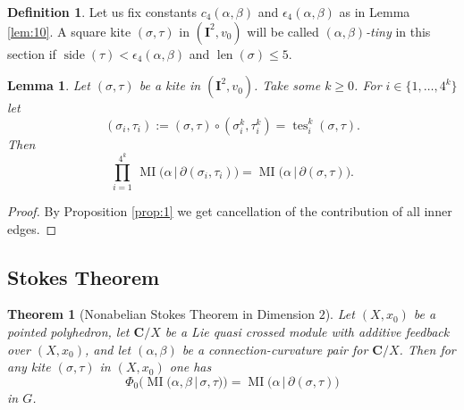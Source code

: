 \documentclass[10pt, a4paper]{amsart}
\newtheorem{thm}[equation]{Theorem}
\newtheorem{lem}[equation]{Lemma}
\theoremstyle{definition}
\newtheorem{dfn}[equation]{Definition}
\numberwithin{equation}{section}
\newcommand{\opn}{\operatorname}
\newcommand{\mbf}[1]{\mathbf{#1}}
\renewcommand{\vert}{\, | \,}
\begin{document}
\begin{dfn} \label{dfn:34}
Let us fix constants $c_4(\alpha, \beta)$ and $\epsilon_4(\alpha, \beta)$ as in
Lemma \ref{lem:10}. 
A square kite $(\sigma, \tau)$ in $(\mbf{I}^2, v_0)$ will be
called {\em $(\alpha, \beta)$-tiny} in this section if 
$\opn{side}(\tau) < \epsilon_4(\alpha, \beta)$ and
$\opn{len}(\sigma) \leq 5$.
\end{dfn}

\begin{lem} \label{lem:7}
Let $(\sigma, \tau)$ be a kite in $(\mbf{I}^2, v_0)$. 
Take some $k \geq 0$. For $i \in \{ 1, \ldots, 4^k \}$ let 
\[ (\sigma_i, \tau_i) := (\sigma, \tau) \circ (\sigma^k_i, \tau^k_i)
= \opn{tes}^k_i (\sigma, \tau) . \]
Then
\[ \prod_{i = 1}^{4^k} \, 
\opn{MI} \bigl( \alpha \vert \partial(\sigma_i, \tau_i) \bigr) =
\opn{MI} \bigl( \alpha \vert \partial  (\sigma, \tau) \bigr) . \]
\end{lem}

\begin{proof}
By Proposition \ref{prop:1} we get cancellation of the contribution of all
inner edges. 
\end{proof}


\subsection{Stokes Theorem}

\begin{thm}[Nonabelian Stokes Theorem in Dimension $2$] \label{thm:1}
Let $(X, x_0)$ be a pointed polyhedron, let 	
$\mbf{C} / X$ be a Lie quasi crossed module with additive feedback over
$(X, x_0)$, and let $(\alpha, \beta)$ be a connection-curvature pair for
$\mbf{C} / X$.
Then for any kite $(\sigma, \tau)$ in $(X, x_0)$ one has
\[ \Phi_0 \bigl( \opn{MI} (\alpha, \beta \vert \sigma, \tau) \bigr) =
\opn{MI} \bigl( \alpha \vert \partial (\sigma, \tau) \bigr)  \]
in $G$.
\end{thm}
\end{document}
